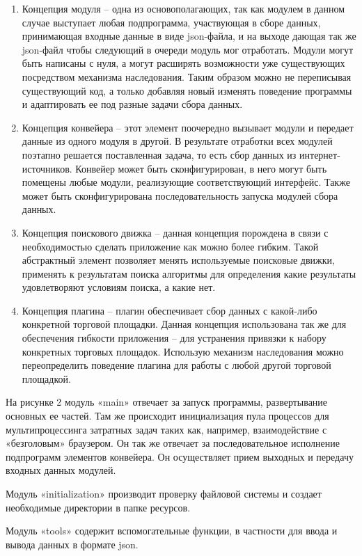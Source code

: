 \documentclass[../main]{subfiles}
\begin{document}
\begin{enumerate}
    \item Концепция модуля – одна из основополагающих, так как модулем в данном случае выступает любая подпрограмма, участвующая в сборе данных, принимающая входные данные в виде json-файла, и на выходе дающая так же json-файл чтобы следующий в очереди модуль мог отработать. Модули могут быть написаны с нуля, а могут расширять возможности уже существующих посредством механизма наследования. Таким образом можно не переписывая существующий код, а только добавляя новый изменять поведение программы и адаптировать ее под разные задачи сбора данных.
    \item Концепция конвейера – этот элемент поочередно вызывает модули и передает данные из одного модуля в другой. В результате отработки всех модулей поэтапно решается поставленная задача, то есть сбор данных из интернет-источников. Конвейер может быть сконфигурирован, в него могут быть помещены любые модули, реализующие соответствующий интерфейс. Также может быть сконфигурирована последовательность запуска модулей сбора данных.
    \item Концепция поискового движка – данная концепция порождена в связи с необходимостью сделать приложение как можно более гибким. Такой абстрактный элемент позволяет менять используемые поисковые движки, применять к результатам поиска алгоритмы для определения какие результаты удовлетворяют условиям поиска, а какие нет.
    \item Концепция плагина – плагин обеспечивает сбор данных с какой-либо конкретной торговой площадки. Данная концепция использована так же для обеспечения гибкости приложения – для устранения привязки к набору конкретных торговых площадок. Использую механизм наследования можно переопределить поведение плагина для работы с любой другой торговой площадкой. 
\end{enumerate}

На рисунке 2 модуль «main» отвечает за запуск программы, развертывание основных ее частей. Там же происходит инициализация пула процессов для мультипроцессинга затратных задач таких как, например, взаимодействие с «безголовым» браузером. Он так же отвечает за последовательное исполнение подпрограмм элементов конвейера. Он осуществляет прием выходных и передачу входных данных модулей.

Модуль «initialization» производит проверку файловой системы и создает необходимые директории в папке ресурсов.

Модуль «tools» содержит вспомогательные функции, в частности для ввода и вывода данных в формате json. 
\end{document}
